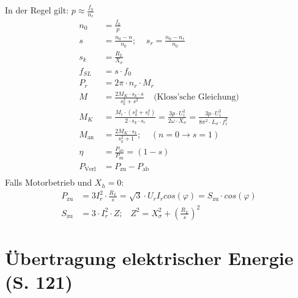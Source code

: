 \documentclass[a4paper,twocolumn,10pt]{article}
\begin{document}
In der Regel gilt: $p\approx\frac{f_0}{n_r}$
\begin{equation*}
\begin{split}
n_0&=\frac{f_0}{p}\\
s&=\frac{n_0-n}{n_0};\;\;\;\;s_r=\frac{n_0-n_r}{n_0}\\
s_k&=\frac{R_L}{X_{\sigma}}\\
f_{SL}&=s\cdot f_0\\
P_r&=2\pi\cdot n_r\cdot M_r\\
M&=\frac{2M_K\cdot s_k\cdot s}{s_k^2+s^2}\;\;\;\;\text{(Kloss'sche Gleichung)}\\
M_K&=\frac{M_r\cdot\left(s_k^2+s_r^2\right)}{2\cdot s_k\cdot s_r}=\frac{3p\cdot U_1^2}{2\omega\cdot X_{\sigma}}=\frac{3p\cdot U_1^2}{8\pi^2\cdot L_{\sigma}\cdot f_1^2}\\
M_{\text{an}}&=\frac{2M_K\cdot s_k}{s_k^2+1};\;\;\;\;(n=0\rightarrow s=1)\\
\eta&=\frac{P_{\text{ab}}}{P_{\text{zu}}}=(1-s)\\
P_{\text{Verl}}&=P_{\text{zu}}-P_{\text{ab}}\\
\end{split}
\end{equation*}
Falls Motorbetrieb und $X_h=0$:
\begin{equation*}
\begin{split}
P_{\text{zu}}&=3I_r^2\cdot\frac{R_L}{s}=\sqrt{3}\cdot U_rI_rcos(\varphi)=S_{\text{zu}}\cdot cos(\varphi)\\
S_{\text{zu}}&=3\cdot I_r^2\cdot Z;\;\;\;Z^2=X_{\sigma}^2+\left(\frac{R_L}{s}\right)^2
\end{split}
\end{equation*}

\newpage

\section{Übertragung elektrischer Energie (S. 121)}
\end{document}
